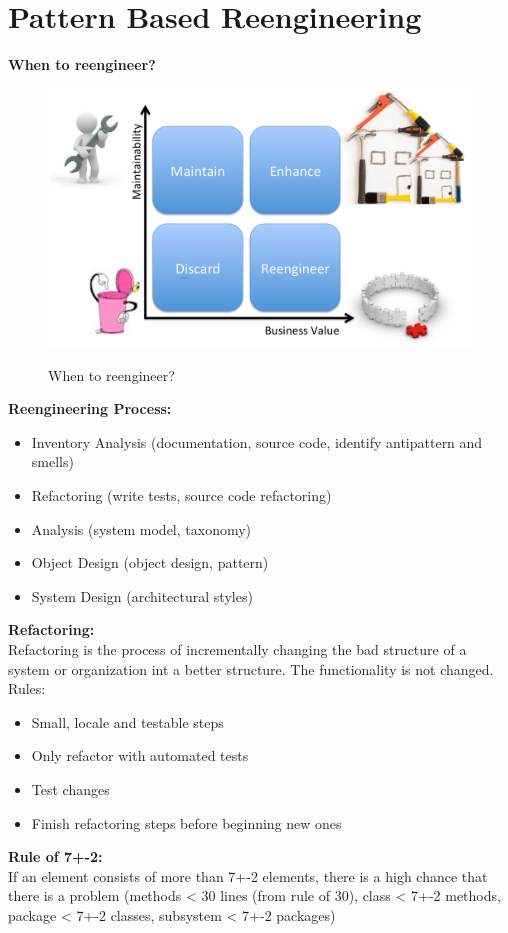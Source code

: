 
\section{Pattern Based Reengineering}
\textbf{When to reengineer?}\\
\begin{figure}[H]
  \centering
  \includegraphics[width=.75\linewidth]{images/reengineering_when.png}\\
  \caption{When to reengineer?}
\end{figure}

\textbf{Reengineering Process:}
\begin{itemize}
  \item Inventory Analysis (documentation, source code, identify antipattern and smells)\
  \item Refactoring (write tests, source code refactoring)
  \item Analysis (system model, taxonomy)
  \item Object Design (object design, pattern)
  \item System Design (architectural styles)
\end{itemize}

\textbf{Refactoring:}\\
Refactoring is the process of incrementally changing the bad structure of a system or organization int a better structure.
The functionality is not changed.\\
Rules:
\begin{itemize}
  \item Small, locale and testable steps
  \item Only refactor with automated tests
  \item Test changes
  \item Finish refactoring steps before beginning new ones
\end{itemize}

\textbf{Rule of 7+-2:}\\
If an element consists of more than 7+-2 elements, there is a high chance that there is a problem (methods < 30 lines (from rule of 30), class < 7+-2 methods, package < 7+-2 classes, subsystem < 7+-2 packages)
\newpage

